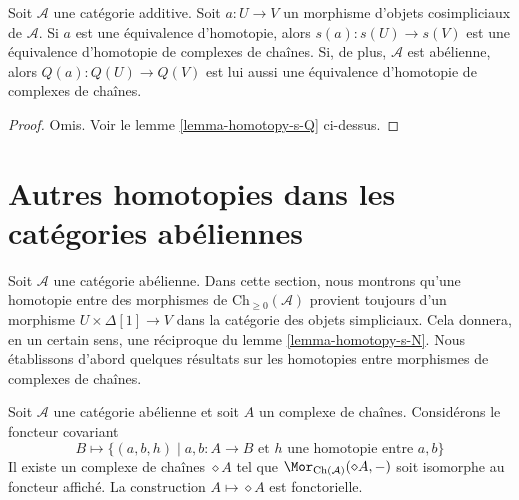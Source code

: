 \begin{lemma}
\label{lemma-homotopy-equivalence-s-Q}
Soit $\mathcal{A}$ une catégorie additive. Soit $a : U \to V$ un morphisme
d'objets cosimpliciaux de $\mathcal{A}$. Si $a$ est une équivalence
d'homotopie, alors $s(a) : s(U) \to s(V)$ est une équivalence d'homotopie de
complexes de chaînes. Si, de plus, $\mathcal{A}$ est abélienne, alors
$Q(a) : Q(U) \to Q(V)$ est lui aussi une équivalence d'homotopie de complexes de chaînes.
\end{lemma}

\begin{proof}
Omis. Voir le lemme \ref{lemma-homotopy-s-Q} ci-dessus.
\end{proof}




\section{Autres homotopies dans les catégories abéliennes}
\label{section-backwards-homotopy}

\noindent
Soit $\mathcal{A}$ une catégorie abélienne.
Dans cette section, nous montrons qu'une homotopie entre des
morphismes de $\text{Ch}_{\geq 0}(\mathcal{A})$ provient toujours d'un
morphisme $U \times \Delta[1] \to V$ dans la catégorie des objets
simpliciaux. Cela donnera, en un certain sens, une réciproque du
lemme \ref{lemma-homotopy-s-N}. Nous établissons d'abord quelques résultats
sur les homotopies entre morphismes de complexes de chaînes.

\begin{lemma}
\label{lemma-represent-homotopy}
Soit $\mathcal{A}$ une catégorie abélienne et soit $A$ un complexe de chaînes.
Considérons le foncteur covariant
$$
B \longmapsto
\{
(a, b, h)
\mid
a, b : A \to B\text{ et }h\text{ une homotopie entre }a, b
\}
$$
Il existe un complexe de chaînes $\diamond A$ tel que
$\Mor_{\text{Ch}(\mathcal{A})}(\diamond A, -)$ soit isomorphe au foncteur
affiché. La construction $A \mapsto \diamond A$ est fonctorielle.
\end{lemma}

